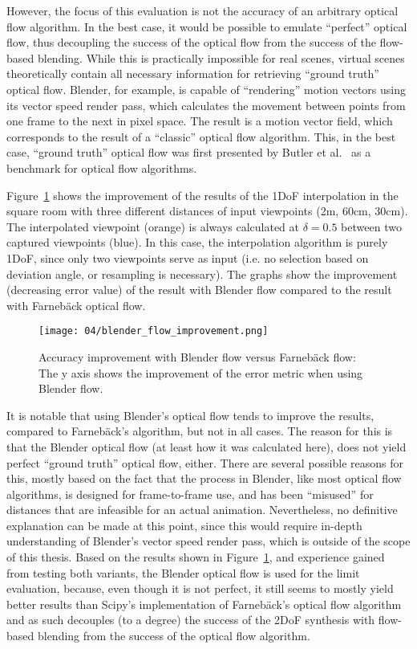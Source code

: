 However, the focus of this evaluation is not the accuracy of an arbitrary optical flow algorithm. In the best case, it would be possible to emulate ``perfect'' optical flow, thus decoupling the success of the optical flow from the success of the flow-based blending. While this is practically impossible for real scenes, virtual scenes theoretically contain all necessary information for retrieving ``ground truth'' optical flow. Blender, for example, is capable of ``rendering'' motion vectors using its vector speed render pass, which calculates the movement between points from one frame to the next in pixel space. The result is a motion vector field, which corresponds to the result of a ``classic'' optical flow algorithm. This, in the best case, ``ground truth'' optical flow was first presented by Butler et al.\ \cite{sintel} as a benchmark for optical flow algorithms.

Figure~\ref{fig:calc_vs_synth_flow} shows the improvement of the results of the 1DoF interpolation in the square room with three different distances of input viewpoints (2m, 60cm, 30cm). The interpolated viewpoint (orange) is always calculated at $\delta = 0.5$ between two captured viewpoints (blue). In this case, the interpolation algorithm is purely 1DoF, since only two viewpoints serve as input (i.e. no selection based on deviation angle, or resampling is necessary). The graphs show the improvement (decreasing error value) of the result with Blender flow compared to the result with Farneb\"ack optical flow.

\begin{figure}
		\centering
		\texttt{[image: 04/blender\_flow\_improvement.png]}
		\caption[Accuracy improvement with Blender flow versus Farneb\"ack flow]{Accuracy improvement with Blender flow versus Farneb\"ack flow: The y axis shows the improvement of the error metric when using Blender flow.}
		\label{fig:calc_vs_synth_flow}
\end{figure}

It is notable that using Blender's optical flow tends to improve the results, compared to Farneb\"ack's algorithm, but not in all cases. The reason for this is that the Blender optical flow (at least how it was calculated here), does not yield perfect ``ground truth'' optical flow, either. There are several possible reasons for this, mostly based on the fact that the process in Blender, like most optical flow algorithms, is designed for frame-to-frame use, and has been ``misused'' for distances that are infeasible for an actual animation. Nevertheless, no definitive explanation can be made at this point, since this would require in-depth understanding of Blender's vector speed render pass, which is outside of the scope of this thesis. Based on the results shown in Figure~\ref{fig:calc_vs_synth_flow}, and experience gained from testing both variants, the Blender optical flow is used for the limit evaluation, because, even though it is not perfect, it still seems to mostly yield better results than Scipy's implementation of Farneb\"ack's optical flow algorithm and as such decouples (to a degree) the success of the 2DoF synthesis with flow-based blending from the success of the optical flow algorithm.

